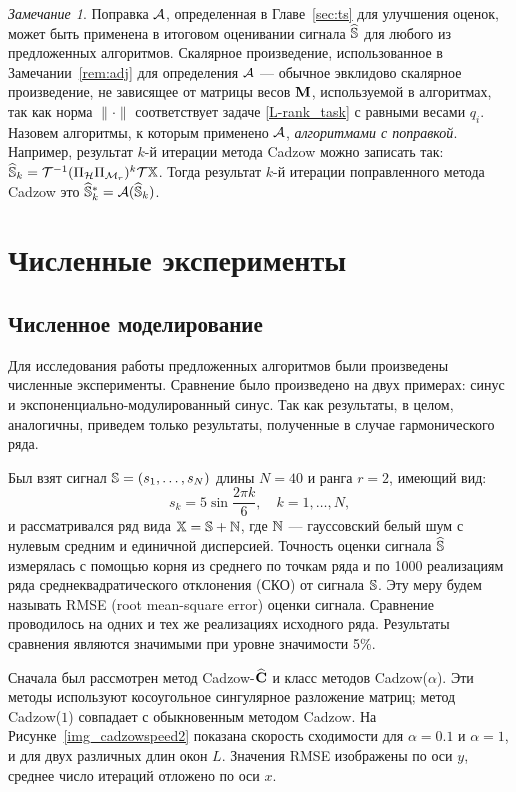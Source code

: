 \documentclass[12pt, specialist, subf,href,colorlinks=true,substylefile = spbu.rtx]{disser}
\theoremstyle{remark}
\newtheorem{remark}{Замечание}
\theoremstyle{definition}
\begin{document}
	\begin{remark}
		\label{rem:adjust}
		 Поправка $\mathcal{A}$, определенная в Главе~\ref{sec:ts} для улучшения оценок, может быть применена в итоговом оценивании сигнала $\widehat{\mathbb{S}}$ для любого из предложенных алгоритмов. Скалярное произведение, использованное в Замечании~\ref{rem:adj} для определения $\mathcal{A}$ --- обычное эвклидово скалярное произведение, не зависящее от матрицы весов $\mathbf{M}$, используемой в алгоритмах, так как норма $\|\cdot\|$ соответствует задаче \eqref{L-rank_task} с равными весами $q_i$. Назовем алгоритмы, к которым применено $\mathcal{A}$, \emph{алгоритмами с поправкой}. Например, результат $k$-й итерации метода Cadzow можно записать так: $\widehat{\mathbb{S}}_k = \mathcal{T}^{-1}(\Pi_{\mathcal{H}} \Pi_{\mathcal{M}_r})^k \mathcal{T} \mathbb{X}$. Тогда результат $k$-й итерации поправленного метода Cadzow это $\widehat{\mathbb{S}}_k^*=\mathcal{A}(\widehat{\mathbb{S}}_k)$.
	\end{remark}

\chapter{Численные эксперименты}
\section{Численное моделирование}
\label{sec:simul}
Для исследования работы предложенных алгоритмов были произведены численные эксперименты. Сравнение было произведено на двух примерах: синус и экспоненциально-модулированный синус. Так как результаты, в целом, аналогичны, приведем только результаты, полученные в случае гармонического ряда.

Был взят сигнал $\mathbb{S} = (s_{1}, \ldots, s_N)$ длины $N = 40$ и ранга $r=2$, имеющий вид:
\begin{equation}
\label{eq:signal}
s_{k} = 5\sin{\frac{2 \pi k}{6}}, \quad k = 1, \ldots, N,
\end{equation}
и рассматривался ряд вида $\mathbb{X} = \mathbb{S} + \mathbb{N}$, где $\mathbb{N}$ --- гауссовский белый шум с нулевым средним и единичной дисперсией. Точность оценки сигнала $\widehat{\mathbb{S}}$ измерялась с помощью корня из среднего по точкам ряда и по 1000 реализациям ряда среднеквадратического отклонения (СКО) от сигнала $\mathbb{S}$. Эту меру будем называть RMSE (root mean-square error) оценки сигнала. Сравнение проводилось на одних и тех же реализациях исходного ряда. Результаты сравнения являются значимыми при уровне значимости 5\%.

Сначала был рассмотрен метод Cadzow-$\widehat{\mathbf{C}}$ и класс методов Cadzow($\alpha$). Эти методы используют косоугольное сингулярное разложение матриц; метод Cadzow($1$) совпадает с обыкновенным методом Cadzow. На Рисунке~\ref{img_cadzowspeed2} показана скорость сходимости для $\alpha = 0.1$ и $\alpha = 1$, и для двух различных длин окон $L$. Значения RMSE изображены по оси $y$, среднее число итераций отложено по оси $x$.
\end{document}
